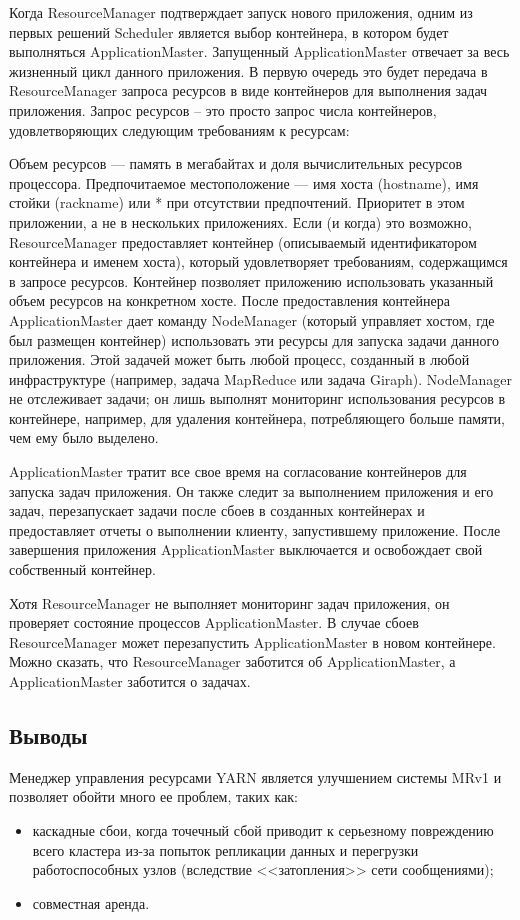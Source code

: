 Когда ResourceManager подтверждает запуск нового приложения, одним из первых решений Scheduler является выбор контейнера, в котором будет выполняться ApplicationMaster. Запущенный ApplicationMaster отвечает за весь жизненный цикл данного приложения. В первую очередь это будет передача в ResourceManager запроса ресурсов в виде контейнеров для выполнения задач приложения. Запрос ресурсов -- это просто запрос числа контейнеров, удовлетворяющих следующим требованиям к ресурсам:

Объем ресурсов --- память в мегабайтах и доля вычислительных ресурсов процессора.
Предпочитаемое местоположение --- имя хоста (hostname), имя стойки (rackname) или * при отсутствии предпочтений.
Приоритет в этом приложении, а не в нескольких приложениях.
Если (и когда) это возможно, ResourceManager предоставляет контейнер (описываемый идентификатором контейнера и именем хоста), который удовлетворяет требованиям, содержащимся в запросе ресурсов. Контейнер позволяет приложению использовать указанный объем ресурсов на конкретном хосте. После предоставления контейнера ApplicationMaster дает команду NodeManager (который управляет хостом, где был размещен контейнер) использовать эти ресурсы для запуска задачи данного приложения. Этой задачей может быть любой процесс, созданный в любой инфраструктуре (например, задача MapReduce или задача Giraph). NodeManager не отслеживает задачи; он лишь выполнят мониторинг использования ресурсов в контейнере, например, для удаления контейнера, потребляющего больше памяти, чем ему было выделено.

ApplicationMaster тратит все свое время на согласование контейнеров для запуска задач приложения. Он также следит за выполнением приложения и его задач, перезапускает задачи после сбоев в созданных контейнерах и предоставляет отчеты о выполнении клиенту, запустившему приложение. После завершения приложения ApplicationMaster выключается и освобождает свой собственный контейнер.

Хотя ResourceManager не выполняет мониторинг задач приложения, он проверяет состояние процессов ApplicationMaster. В случае сбоев ResourceManager может перезапустить ApplicationMaster в новом контейнере. Можно сказать, что ResourceManager заботится об ApplicationMaster, а ApplicationMaster заботится о задачах.

\subsection*{Выводы}
Менеджер управления ресурсами YARN является улучшением системы MRv1 и позволяет обойти много ее проблем, таких как:
\begin{itemize}
    \item каскадные сбои, когда точечный сбой приводит к серьезному повреждению всего кластера из-за попыток репликации данных и перегрузки работоспособных узлов (вследствие <<затопления>> сети сообщениями);
    \item совместная аренда. 
\end{itemize}


